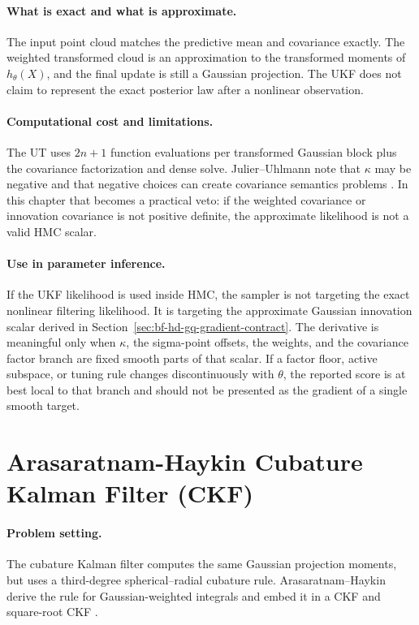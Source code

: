 \paragraph{What is exact and what is approximate.}
The input point cloud matches the predictive mean and covariance exactly.  The
weighted transformed cloud is an approximation to the transformed moments of
\(h_\theta(X)\), and the final update is still a Gaussian projection.  The UKF
does not claim to represent the exact posterior law after a nonlinear
observation.

\paragraph{Computational cost and limitations.}
The UT uses \(2n+1\) function evaluations per transformed Gaussian block plus
the covariance factorization and dense solve.  Julier--Uhlmann note that
\(\kappa\) may be negative and that negative choices can create covariance
semantics problems \citep{julier1997new}.  In this chapter that becomes a
practical veto: if the weighted covariance or innovation covariance is not
positive definite, the approximate likelihood is not a valid HMC scalar.

\paragraph{Use in parameter inference.}
If the UKF likelihood is used inside HMC, the sampler is not targeting the
exact nonlinear filtering likelihood.  It is targeting the approximate
Gaussian innovation scalar derived in
Section~\ref{sec:bf-hd-gq-gradient-contract}.  The derivative is meaningful
only when \(\kappa\), the sigma-point offsets, the weights, and the covariance
factor branch are fixed smooth parts of that scalar.  If a factor floor, active
subspace, or tuning rule changes discontinuously with \(\theta\), the reported
score is at best local to that branch and should not be presented as the
gradient of a single smooth target.

\section{Arasaratnam-Haykin Cubature Kalman Filter (CKF)}
\label{sec:bf-hd-ckf}

\paragraph{Problem setting.}
The cubature Kalman filter computes the same Gaussian projection moments, but
uses a third-degree spherical--radial cubature rule.  Arasaratnam--Haykin
derive the rule for Gaussian-weighted integrals and embed it in a CKF and
square-root CKF \citep{arasaratnam2009cubature}.


